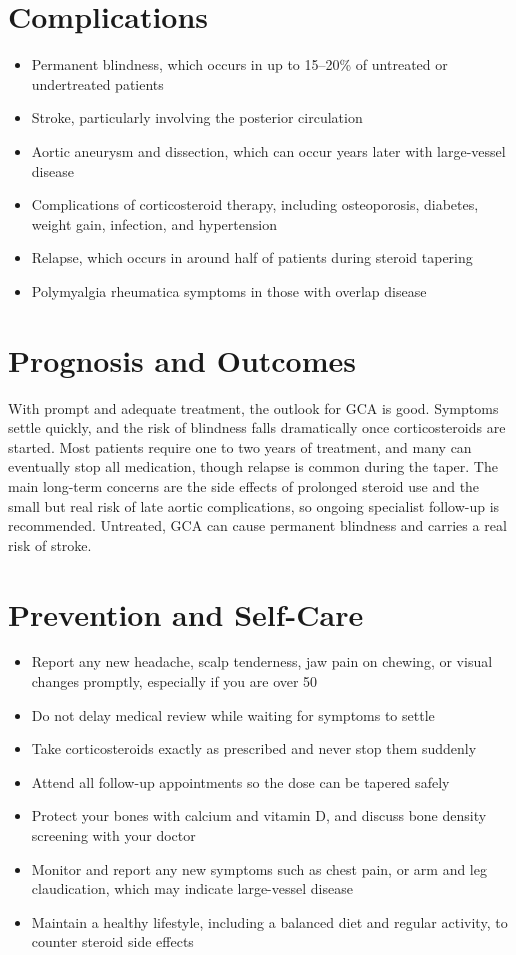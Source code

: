 \section*{Complications}
\begin{itemize}
    \item Permanent blindness, which occurs in up to 15--20\% of untreated or undertreated patients
    \item Stroke, particularly involving the posterior circulation
    \item Aortic aneurysm and dissection, which can occur years later with large-vessel disease
    \item Complications of corticosteroid therapy, including osteoporosis, diabetes, weight gain, infection, and hypertension
    \item Relapse, which occurs in around half of patients during steroid tapering
    \item Polymyalgia rheumatica symptoms in those with overlap disease
\end{itemize}

\section*{Prognosis and Outcomes}
With prompt and adequate treatment, the outlook for GCA is good. Symptoms settle quickly, and the risk of blindness falls dramatically once corticosteroids are started. Most patients require one to two years of treatment, and many can eventually stop all medication, though relapse is common during the taper. The main long-term concerns are the side effects of prolonged steroid use and the small but real risk of late aortic complications, so ongoing specialist follow-up is recommended. Untreated, GCA can cause permanent blindness and carries a real risk of stroke.

\section*{Prevention and Self-Care}
\begin{itemize}
    \item Report any new headache, scalp tenderness, jaw pain on chewing, or visual changes promptly, especially if you are over 50
    \item Do not delay medical review while waiting for symptoms to settle
    \item Take corticosteroids exactly as prescribed and never stop them suddenly
    \item Attend all follow-up appointments so the dose can be tapered safely
    \item Protect your bones with calcium and vitamin D, and discuss bone density screening with your doctor
    \item Monitor and report any new symptoms such as chest pain, or arm and leg claudication, which may indicate large-vessel disease
    \item Maintain a healthy lifestyle, including a balanced diet and regular activity, to counter steroid side effects
\end{itemize}


